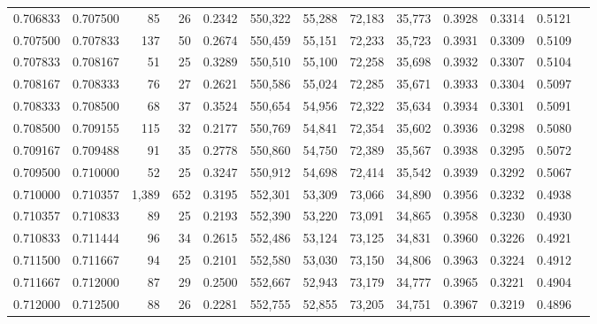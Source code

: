 \begin{tabular}{rrrrrrrrrrrrr}
0.706833 & 0.707500 &    85 &  26 &                                     0.2342 & 550,322 &  55,288 &  72,183 &  35,773 & 0.3928 & 0.3314 & 0.5121 \\
0.707500 & 0.707833 &   137 &  50 &                                     0.2674 & 550,459 &  55,151 &  72,233 &  35,723 & 0.3931 & 0.3309 & 0.5109 \\
0.707833 & 0.708167 &    51 &  25 &                                     0.3289 & 550,510 &  55,100 &  72,258 &  35,698 & 0.3932 & 0.3307 & 0.5104 \\
0.708167 & 0.708333 &    76 &  27 &                                     0.2621 & 550,586 &  55,024 &  72,285 &  35,671 & 0.3933 & 0.3304 & 0.5097 \\
0.708333 & 0.708500 &    68 &  37 &                                     0.3524 & 550,654 &  54,956 &  72,322 &  35,634 & 0.3934 & 0.3301 & 0.5091 \\
0.708500 & 0.709155 &   115 &  32 &                                     0.2177 & 550,769 &  54,841 &  72,354 &  35,602 & 0.3936 & 0.3298 & 0.5080 \\
0.709167 & 0.709488 &    91 &  35 &                                     0.2778 & 550,860 &  54,750 &  72,389 &  35,567 & 0.3938 & 0.3295 & 0.5072 \\
0.709500 & 0.710000 &    52 &  25 &                                     0.3247 & 550,912 &  54,698 &  72,414 &  35,542 & 0.3939 & 0.3292 & 0.5067 \\
0.710000 & 0.710357 & 1,389 & 652 &                                     0.3195 & 552,301 &  53,309 &  73,066 &  34,890 & 0.3956 & 0.3232 & 0.4938 \\
0.710357 & 0.710833 &    89 &  25 &                                     0.2193 & 552,390 &  53,220 &  73,091 &  34,865 & 0.3958 & 0.3230 & 0.4930 \\
0.710833 & 0.711444 &    96 &  34 &                                     0.2615 & 552,486 &  53,124 &  73,125 &  34,831 & 0.3960 & 0.3226 & 0.4921 \\
0.711500 & 0.711667 &    94 &  25 &                                     0.2101 & 552,580 &  53,030 &  73,150 &  34,806 & 0.3963 & 0.3224 & 0.4912 \\
0.711667 & 0.712000 &    87 &  29 &                                     0.2500 & 552,667 &  52,943 &  73,179 &  34,777 & 0.3965 & 0.3221 & 0.4904 \\
0.712000 & 0.712500 &    88 &  26 &                                     0.2281 & 552,755 &  52,855 &  73,205 &  34,751 & 0.3967 & 0.3219 & 0.4896 \\

\end{tabular}

